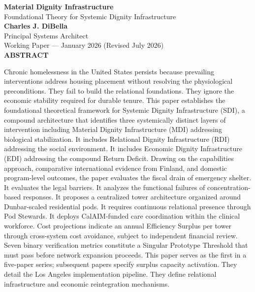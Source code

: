 \documentclass[12pt, letterpaper]{article}
\begin{document}
\begin{titlepage}
\begin{center}
{\LARGE \textbf{Material Dignity Infrastructure}}\\[6pt]
{\large Foundational Theory for Systemic Dignity Infrastructure}\\[1.0cm]
{\normalsize \textbf{Charles J. DiBella}}\\[0.01cm]
{\normalsize Principal Systems Architect}\\[0.01cm]
{\normalsize Working Paper --- January 2026 (Revised July 2026)}\\[0.5cm]
\textbf{ABSTRACT}
\vspace{0.5cm}
\end{center}
\begin{minipage}{0.95\textwidth}
\noindent

Chronic homelessness in the United States persists because prevailing interventions address housing placement without resolving the physiological preconditions. They fail to build the relational foundations. They ignore the economic stability required for durable tenure. This paper establishes the foundational theoretical framework for Systemic Dignity Infrastructure (SDI), a compound architecture that identifies three systemically distinct layers of intervention including Material Dignity Infrastructure (MDI) addressing biological stabilization. It includes Relational Dignity Infrastructure (RDI) addressing the social environment. It includes Economic Dignity Infrastructure (EDI) addressing the compound Return Deficit. Drawing on the capabilities approach, comparative international evidence from Finland, and domestic program-level outcomes, the paper evaluates the fiscal drain of emergency shelter. It evaluates the legal barriers. It analyzes the functional failures of concentration-based responses. It proposes a centralized tower architecture organized around Dunbar-scaled residential pods. It requires continuous relational presence through Pod Stewards. It deploys CalAIM-funded care coordination within the clinical workforce. Cost projections indicate an annual Efficiency Surplus per tower through cross-system cost avoidance, subject to independent financial review. Seven binary verification metrics constitute a Singular Prototype Threshold that must pass before network expansion proceeds. This paper serves as the first in a five-paper series; subsequent papers specify surplus capacity activation. They detail the Los Angeles implementation pipeline. They define relational infrastructure and economic reintegration mechanisms.

\end{minipage}
\end{titlepage}
\end{document}
